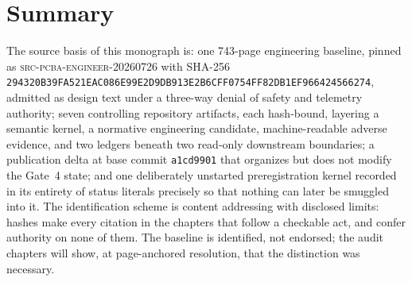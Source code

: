 \section{Summary}\label{ch03:summary}

The source basis of this monograph is: one 743-page engineering
baseline, pinned as \textsc{src-pcba-engineer-20260726} with SHA-256
\texttt{294320B39FA521EAC086E99E2D9DB913E2B6CFF0754FF82DB1EF966424566274},
admitted as design text under a three-way denial of safety and
telemetry authority; seven controlling repository artifacts, each
hash-bound, layering a semantic kernel, a normative engineering
candidate, machine-readable adverse evidence, and two ledgers beneath
two read-only downstream boundaries; a publication delta at base commit
\texttt{a1cd9901} that organizes but does not modify the Gate~4 state;
and one deliberately unstarted preregistration kernel recorded in its
entirety of status literals precisely so that nothing can later be
smuggled into it. The identification scheme is content addressing with
disclosed limits: hashes make every citation in the chapters that
follow a checkable act, and confer authority on none of them. The
baseline is identified, not endorsed; the audit chapters will show, at
page-anchored resolution, that the distinction was necessary.
